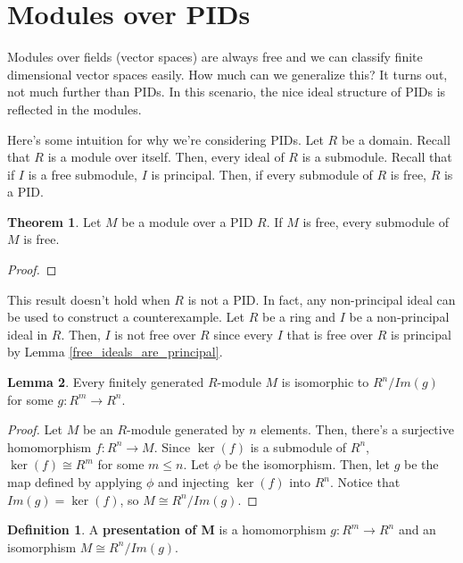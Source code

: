 \documentclass{article}
\theoremstyle{definition}
\newtheorem{definition}{Definition}
\newtheorem{theorem}{Theorem}[section]
\newtheorem{lemma}[theorem]{Lemma}
\begin{document}
\newpage

\section{Modules over PIDs}

Modules over fields (vector spaces) are always free and we can classify finite dimensional vector spaces easily.
How much can we generalize this? It turns out, not much further than PIDs. In this scenario, the nice ideal structure 
of PIDs is reflected in the modules.

Here's some intuition for why we're considering PIDs. Let $R$ be a domain. Recall that $R$ is a module
over itself. Then, every ideal of $R$ is a submodule. Recall that if $I$ is a free submodule, $I$ is principal.
Then, if every submodule of $R$ is free, $R$ is a PID.

\begin{theorem}
    Let $M$ be a module over a PID $R$. If $M$ is free, every submodule of $M$ is free.
\end{theorem}
\begin{proof}
    
\end{proof}

This result doesn't hold when $R$ is not a PID.
In fact, any non-principal ideal can be used to construct a counterexample. 
Let $R$ be a ring and $I$ be a non-principal ideal in $R$. 
Then, $I$ is not free over $R$ since every $I$ that is free over $R$ is principal by Lemma \ref{free_ideals_are_principal}.

\begin{lemma}\label{injective_presentations_exist}
    Every finitely generated $R$-module $M$ is isomorphic to $R^{n}/Im(g)$ for some $g: R^{m} \xrightarrow{} R^{n}$.
\end{lemma}
\begin{proof}
    Let $M$ be an $R$-module generated by $n$ elements.
    Then, there's a surjective homomorphism $f:R^{n} \xrightarrow{} M$.
    Since $\ker(f)$ is a submodule of $R^{n}$, $\ker(f) \cong R^{m}$ for some $m \leq n$. Let $\phi$ be the isomorphism.
    Then, let $g$ be the map defined by applying $\phi$ and injecting $\ker(f)$ into $R^{n}$. Notice that $Im(g) = \ker(f)$,
    so $M \cong R^{n}/Im(g)$.
\end{proof}

\begin{definition}
    A \textbf{presentation of M} is a homomorphism $g: R^{m} \xrightarrow{} R^{n}$ and an isomorphism $M \cong R^{n}/Im(g)$.
\end{definition}
\end{document}

